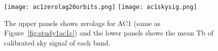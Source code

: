 \begin{figure}[!t]
\centering
\texttt{[image: ac1zerolag20orbits.png]}
\texttt{[image: ac1skysig.png]}
\caption{The upper panels shows zerolags for AC1 (same as Figure~\ref{fig:study1ac1c}) and the lower panels shows the mean Tb of calibrated sky signal of each band.}
\label{fig:study1ac1skysig}
\end{figure} 


  






